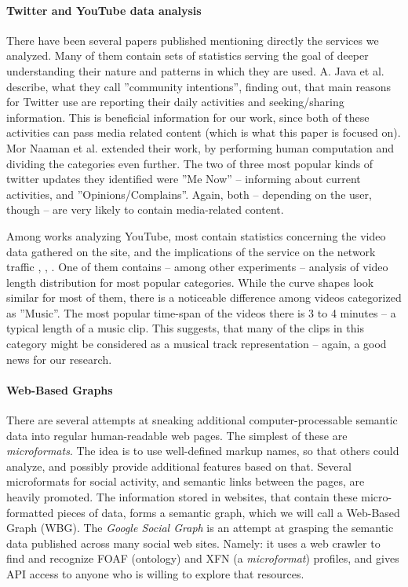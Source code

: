 \paragraph{Twitter and YouTube data analysis} There have been several papers published
mentioning directly the services we analyzed. Many of them contain sets of
statistics serving the goal of deeper understanding their nature and patterns
in which they are used. A. Java et al. \cite{why-we-twitter} describe, what
they call ''community intentions'', finding out, that main reasons for Twitter
use are reporting their daily activities and seeking/sharing information. This
is beneficial information for our work, since both
of these activities can pass media related content (which is what this paper is
focused on). Mor Naaman et al. \cite{twitter-content-is-it} extended their
work, by performing human computation and dividing the categories even further.
The two of three most popular kinds of twitter updates they identified were
''Me Now'' -- informing about current activities, and ''Opinions/Complains''.
Again, both -- depending on the user, though -- are very likely to contain
media-related content.

Among works analyzing YouTube, most contain statistics concerning the video
data gathered on the site, and the implications of the service on the network
traffic \cite{i-tube-you-tube}, \cite{views-from-the-edge},
\cite{statistics-and-social-network}. One of them
\cite{statistics-and-social-network} contains -- among other experiments --
analysis of video length distribution for most popular categories.  While the
curve shapes look similar for most of them, there is a noticeable difference
among videos categorized as ''Music''. The most popular time-span of the videos
there is 3 to 4 minutes -- a typical length of a music clip. This suggests,
that many of the clips in this category might be considered as a musical track
representation -- again, a good news for our research.

\paragraph{Web-Based Graphs} There are several attempts at sneaking additional
computer-processable semantic data into regular human-readable web pages.  The
simplest of these are \textit{microformats}. The idea is to use well-defined
markup names, so that others could analyze, and possibly provide additional
features based on that. Several microformats for social activity, and semantic
links between the pages, are heavily promoted. The information stored in
websites, that contain these micro-formatted pieces of data, forms a semantic
graph, which we will call a Web-Based Graph (WBG).  
The \textit{Google Social Graph} is an attempt at grasping
the semantic data published across many social web sites. Namely: it uses a web
crawler to find and recognize FOAF (ontology) and XFN (a \textit{microformat}) profiles,
and gives API access to anyone who is willing to explore that resources.

